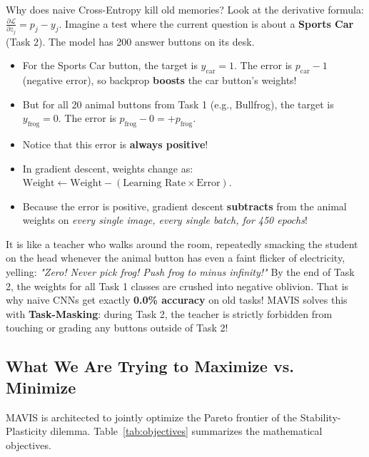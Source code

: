 \documentclass[11pt,a4paper]{article}
\begin{document}
\begin{callout}
Why does naive Cross-Entropy kill old memories? Look at the derivative formula: $\frac{\partial \mathcal{L}}{\partial z_j} = p_j - y_j$.\newline
Imagine a test where the current question is about a \textbf{Sports Car} (Task 2). The model has 200 answer buttons on its desk.
\begin{itemize}[noitemsep]
    \item For the Sports Car button, the target is $y_{\text{car}} = 1$. The error is $p_{\text{car}} - 1$ (negative error), so backprop \textbf{boosts} the car button's weights!
    \item But for all 20 animal buttons from Task 1 (e.g., Bullfrog), the target is $y_{\text{frog}} = 0$. The error is $p_{\text{frog}} - 0 = +p_{\text{frog}}$.
    \item Notice that this error is \textbf{always positive}!
    \item In gradient descent, weights change as: $\text{Weight} \leftarrow \text{Weight} - (\text{Learning Rate} \times \text{Error})$.
    \item Because the error is positive, gradient descent \textbf{subtracts} from the animal weights on \textit{every single image, every single batch, for 450 epochs}!
\end{itemize}
It is like a teacher who walks around the room, repeatedly smacking the student on the head whenever the animal button has even a faint flicker of electricity, yelling: \textit{"Zero! Never pick frog! Push frog to minus infinity!"}\newline
By the end of Task 2, the weights for all Task 1 classes are crushed into negative oblivion. That is why naive CNNs get exactly \textbf{0.0\% accuracy} on old tasks! MAVIS solves this with \textbf{Task-Masking}: during Task 2, the teacher is strictly forbidden from touching or grading any buttons outside of Task 2!
\end{callout}

\subsection{What We Are Trying to Maximize vs. Minimize}
MAVIS is architected to jointly optimize the Pareto frontier of the Stability-Plasticity dilemma. Table~\ref{tab:objectives} summarizes the mathematical objectives.
\end{document}
